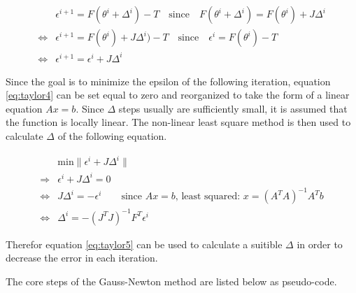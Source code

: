 \begin{align}
	& \epsilon^{i+1} = F(\theta^{i} + \Delta^{i}) - T \quad \text{since} \quad F(\theta^{i} + \Delta^{i}) = F(\theta^{i}) + J \Delta^{i} \\
	\Leftrightarrow & \epsilon^{i+1} = F(\theta^{i}) + J \Delta^{i}) - T \quad \text{since} \quad \epsilon^{i} = F(\theta^{i}) - T \\
	\Leftrightarrow & \epsilon^{i+1} = \epsilon^{i} + J \Delta^{i} \label{eq:taylor4}
\end{align}

Since the goal is to minimize the epsilon of the following iteration, equation \ref*{eq:taylor4} can be set equal to zero and reorganized to
take the form of a linear equation $Ax = b$. Since $\Delta$ steps usually are sufficiently small, it is assumed that the function is locally
linear. The non-linear least square method is then used to calculate $\Delta$ of the following equation.

\begin{align}
	&\text{min} \| \epsilon^{i} + J \Delta^{i} \| \\
	\Rightarrow & \epsilon^{i} + J \Delta^{i} = 0 \\
	\Leftrightarrow & J \Delta^{i} = -\epsilon^{i} \qquad \text{since $Ax = b$, least squared: } x = (A^T A)^{-1} A^T b \\
	\Leftrightarrow & \Delta^{i} = - (J^T J)^{-1} F^T \epsilon^{i} \label{eq:taylor5}
\end{align}

Therefor equation \ref*{eq:taylor5} can be used to calculate a suitible $\Delta$ in order to decrease the error in each iteration. \newline

The core steps of the Gauss-Newton method are listed below as pseudo-code.



